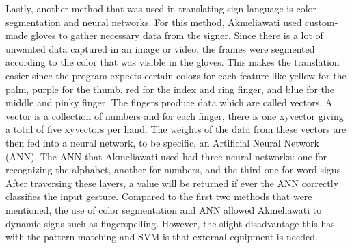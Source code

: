 \documentclass[journal]{./IEEE/IEEEtran}
\begin{document}
\newline
\indent Lastly, another method that was used in translating sign language is color segmentation and neural networks. For this method, Akmeliawati \cite{Akmeliawati2007} used custom-made gloves to gather necessary data from the signer. Since there is a lot of unwanted data captured in an image or video, the frames were segmented according to the color that was visible in the gloves. This makes the translation easier since the program expects certain colors for each feature like yellow for the palm, purple for the thumb, red for the index and ring finger, and blue for the middle and pinky finger.
\newline
\indent The fingers produce data which are called vectors. A vector is a collection of numbers and for each finger, there is one xyvector giving a total of five xyvectors per hand. The weights of the data from these vectors are then fed into a neural network, to be specific, an Artificial Neural Network (ANN). The ANN that Akmeliawati used had three neural networks: one for recognizing the alphabet, another for numbers, and the third one for word signs. After traversing these layers, a value will be returned if ever the ANN correctly classifies the input gesture. Compared to the first two methods that were mentioned, the use of color segmentation and ANN allowed Akmeliawati to dynamic signs such as fingerspelling. However, the slight disadvantage this has with the pattern matching and SVM is that external equipment is needed.
\end{document}
